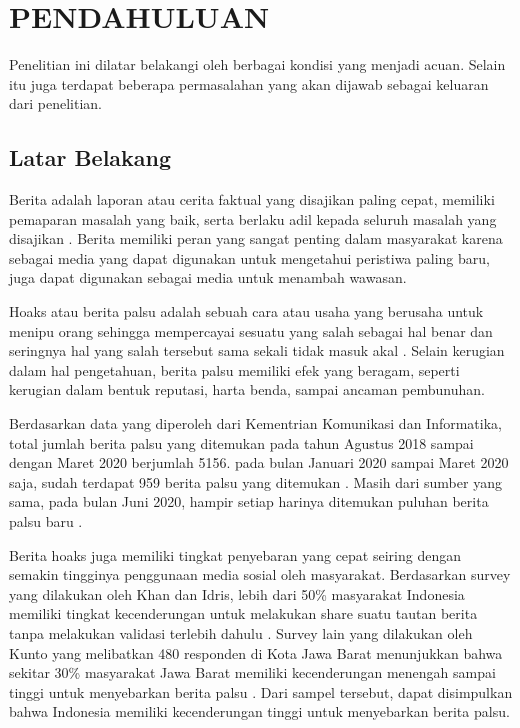 \chapter{PENDAHULUAN}
\label{chap:pendahuluan}


Penelitian ini dilatar belakangi oleh berbagai kondisi yang menjadi acuan. Selain itu juga terdapat beberapa permasalahan yang akan dijawab sebagai keluaran dari penelitian.

\section{Latar Belakang}
\label{sec:latarbelakang}

Berita adalah laporan atau cerita faktual yang disajikan paling cepat, memiliki pemaparan masalah yang baik, serta berlaku adil kepada seluruh masalah yang disajikan \cite{rani2013persepsi}. Berita memiliki peran yang sangat penting dalam masyarakat karena sebagai media yang dapat digunakan untuk mengetahui peristiwa paling baru, juga dapat digunakan sebagai media untuk menambah wawasan.

Hoaks atau berita palsu adalah sebuah cara atau usaha yang berusaha untuk menipu orang sehingga mempercayai sesuatu yang salah sebagai hal benar dan seringnya hal yang salah tersebut sama sekali tidak masuk akal \cite{berita_bohong}. Selain kerugian dalam hal pengetahuan, berita palsu memiliki efek yang beragam, seperti kerugian dalam bentuk reputasi, harta benda, sampai ancaman pembunuhan.

Berdasarkan data yang diperoleh dari Kementrian Komunikasi dan Informatika, total jumlah berita palsu yang ditemukan pada tahun Agustus 2018 sampai dengan Maret 2020 berjumlah 5156. pada bulan Januari 2020 sampai Maret 2020 saja, sudah terdapat 959 berita palsu yang ditemukan \cite{kominfoStatHoax}. Masih dari sumber yang sama, pada bulan Juni 2020, hampir setiap harinya ditemukan puluhan berita palsu baru \cite{kominfoJuni2020}.

Berita hoaks juga memiliki tingkat penyebaran yang cepat seiring dengan semakin tingginya penggunaan media sosial oleh masyarakat. Berdasarkan survey yang dilakukan oleh Khan dan Idris, lebih dari 50\% masyarakat Indonesia memiliki tingkat kecenderungan untuk melakukan share suatu tautan berita tanpa melakukan validasi terlebih dahulu \cite{khan}. Survey lain yang dilakukan oleh Kunto yang melibatkan 480 responden di Kota Jawa Barat menunjukkan bahwa sekitar 30\% masyarakat Jawa Barat memiliki kecenderungan menengah sampai tinggi untuk menyebarkan berita palsu \cite{kuntoUmur}. Dari sampel tersebut, dapat disimpulkan bahwa Indonesia memiliki kecenderungan tinggi untuk menyebarkan berita palsu.


